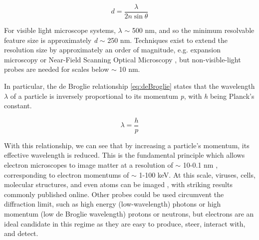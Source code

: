         \begin{equation}\label{eq:diffraction}
            d = \frac{\lambda}{2n\sin{\theta}}
        \end{equation}
        
        For visible light microscope systems, $\lambda$ $\sim$ 500 nm, and so the minimum resolvable feature size is approximately \textit{d} $\sim$ 250 nm. Techniques exist to extend the resolution size by approximately an order of magnitude, e.g. expansion microscopy \parencite{Chen2015ExpansionMicroscopy} or Near-Field Scanning Optical Microscopy \parencite{Ma20216Source}, but non-visible-light probes are needed for scales below $\sim$ 10 nm. 

        

        In particular, the de Broglie relationship \ref{eq:deBroglie} \parencite{Broglie1924AQuanta} states that the wavelength $\lambda$ of a particle is inversely proportional to its momentum \textit{p}, with \textit{h} being Planck's constant. 
        
            \begin{equation}\label{eq:deBroglie}
               \lambda = \frac{h}{p}
            \end{equation}

        With this relationship, we can see that by increasing a particle's momentum, its effective wavelength is reduced. This is the fundamental principle which allows electron microscopes to image matter at a resolution of $\sim$ 10-0.1 nm \parencite{Franken2020ADevelopments}, corresponding to electron momentums of $\sim$ 1-100 keV. At this scale, viruses, cells, molecular structures, and even atoms can be imaged \parencite{Williams2009TransmissionMicroscopy}, with striking results commonly published online. Other probes could be used circumvent the diffraction limit, such as high energy (low-wavelength) photons or high momentum (low de Broglie wavelength) protons or neutrons, but electrons are an ideal candidate in this regime as they are easy to produce, steer, interact with, and detect. 

